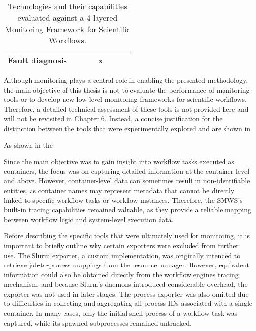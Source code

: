 \begin{table}[htbp]
{\begin{tabular}{lccccccc}
            Fault diagnosis                     &                   &                               &                          & x                   &                         &                           &                           \\
            \bottomrule
        \end{tabular}
    }
    \caption{Technologies and their capabilities evaluated against a 4-layered Monitoring Framework for Scientific Workflows.}
    \label{tab:monitoring-features}
\end{table}

Although monitoring plays a central role in enabling the presented methodology, the main objective of this thesis is not to evaluate the performance of monitoring tools or to develop new low-level monitoring frameworks for scientific workflows. Therefore, a detailed technical assessment of these tools is not provided here and will not be revisited in Chapter 6. Instead, a concise justification for the distinction between the tools that were experimentally explored and are shown in %

As shown in the %

Since the main objective was to gain insight into workflow tasks executed as containers, the focus was on capturing detailed information at the container level and above. However, container-level data can sometimes result in non-identifiable entities, as container names may represent metadata that cannot be directly linked to specific workflow tasks or workflow instances. Therefore, the SMWS's built-in tracing capabilities remained valuable, as they provide a reliable mapping between workflow logic and system-level execution data.

Before describing the specific tools that were ultimately used for monitoring, it is important to briefly outline why certain exporters were excluded from further use. The Slurm exporter, a custom implementation, was originally intended to retrieve job-to-process mappings from the resource manager. However, equivalent information could also be obtained directly from the workflow engines tracing mechanism, and because Slurm's daemons introduced considerable overhead, the exporter was not used in later stages. The process exporter was also omitted due to difficulties in collecting and aggregating all process IDs associated with a single container. In many cases, only the initial shell process of a workflow task was captured, while its spawned subprocesses remained untracked.

